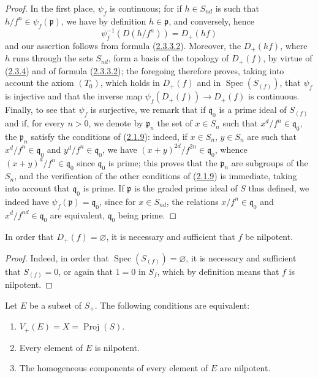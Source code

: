 \begin{proof}
In the first place, $\psi_f$ is continuous; for if $h\in S_{nd}$ is such
that $h/f^n\in\psi_f(\mathfrak{p})$, we have by definition
$h\in\mathfrak{p}$, and conversely, hence
\[
  \psi_f^{-1}(D(h/f^n))=D_+(hf)
\]
and our assertion follows from formula
(\hyperref[II.2.3.3.2]{2.3.3.2}). Moreover, the $D_+(hf)$, where $h$
runs through the sets $S_{nd}$, form a basis of the topology of
$D_+(f)$, by virtue of (\hyperref[II.2.3.4]{2.3.4}) and of formula
(\hyperref[II.2.3.3.2]{2.3.3.2}); the
foregoing therefore proves, taking into account the axiom $(T_0)$, which
holds in $D_+(f)$ and in $\operatorname{Spec}(S_{(f)})$, that $\psi_f$ is
injective and that the inverse map
$\psi_f(D_+(f))\longrightarrow D_+(f)$ is continuous. Finally, to see that
$\psi_f$ is surjective, we remark that if $\mathfrak{q}_0$ is a prime
ideal of $S_{(f)}$ and if, for every $n>0$, we denote by
$\mathfrak{p}_n$ the set of $x\in S_n$ such that
$x^d/f^n\in\mathfrak{q}_0$, the $\mathfrak{p}_n$ satisfy the conditions
of (\hyperref[II.2.1.9]{2.1.9}): indeed, if $x\in S_n$, $y\in S_n$
are such that $x^d/f^n\in\mathfrak{q}_0$ and
$y^d/f^n\in\mathfrak{q}_0$, we have
$(x+y)^{2d}/f^{2n}\in\mathfrak{q}_0$, whence
$(x+y)^d/f^n\in\mathfrak{q}_0$ since $\mathfrak{q}_0$ is prime;
this proves that the $\mathfrak{p}_n$ are subgroups of the $S_n$, and the
verification of the other conditions of
(\hyperref[II.2.1.9]{2.1.9}) is immediate, taking into account that
$\mathfrak{q}_0$ is prime. If $\mathfrak{p}$ is the graded prime ideal
of $S$ thus defined, we indeed have
$\psi_f(\mathfrak{p})=\mathfrak{q}_0$, since for $x\in S_{nd}$, the relations
$x/f^n\in\mathfrak{q}_0$ and $x^d/f^{nd}\in\mathfrak{q}_0$ are
equivalent, $\mathfrak{q}_0$ being prime.
\end{proof}

\begin{corollary}[2.3.7]
\label{II.2.3.7}
In order that $D_+(f)=\varnothing$, it is necessary and sufficient that $f$
be nilpotent.
\end{corollary}

\begin{proof}
Indeed, in order that $\operatorname{Spec}(S_{(f)})=\varnothing$, it is
necessary and sufficient that $S_{(f)}=0$, or again that $1=0$ in $S_f$,
which by definition means that $f$ is nilpotent.
\end{proof}

\begin{corollary}[2.3.8]
\label{II.2.3.8}
Let $E$ be a subset of $S_+$. The following conditions are equivalent:
\begin{enumerate}
  \item[\rm a)] $V_+(E)=X=\operatorname{Proj}(S)$.
  \item[\rm b)] Every element of $E$ is nilpotent.
  \item[\rm c)] The homogeneous components of every element of $E$ are
    nilpotent.
\end{enumerate}
\end{corollary}

